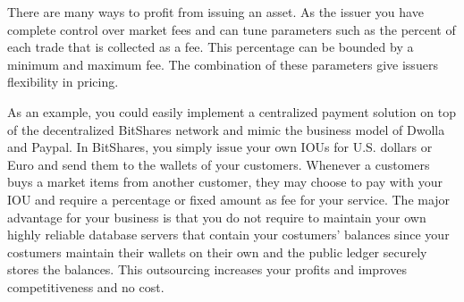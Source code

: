 There are many ways to profit from issuing an asset. As the issuer you have
complete control over market fees and can tune parameters such as the percent
of each trade that is collected as a fee. This percentage can be bounded by a
minimum and maximum fee. The combination of these parameters give issuers
flexibility in pricing.

As an example, you could easily implement a centralized payment solution on top
of the decentralized BitShares network and mimic the business model of Dwolla
and Paypal. In BitShares, you simply issue your own IOUs for U.S. dollars or
Euro and send them to the wallets of your customers. Whenever a customers buys
a market items from another customer, they may choose to pay with your IOU and
require a percentage or fixed amount as fee for your service. The major
advantage for your business is that you do not require to maintain your own
highly reliable database servers that contain your costumers' balances since
your costumers maintain their wallets on their own and the public ledger
securely stores the balances. This outsourcing increases your profits and
improves competitiveness and no cost.
